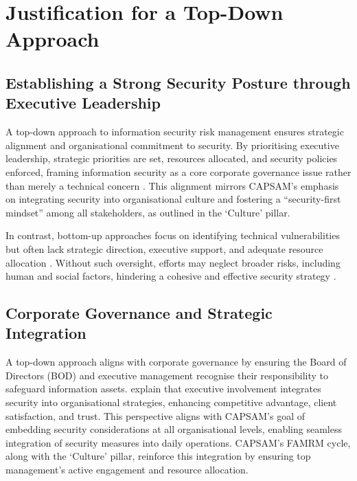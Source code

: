 \section{Justification for a Top-Down Approach}
    \subsection{Establishing a Strong Security Posture through Executive Leadership}
    A top-down approach to information security risk management ensures strategic alignment and organisational commitment to security. By prioritising executive leadership, strategic priorities are set, resources allocated, and security policies enforced, framing information security as a core corporate governance issue rather than merely a technical concern \citep{linkov2014risk, fazlida2015information}. This alignment mirrors CAPSAM's emphasis on integrating security into organisational culture and fostering a ``security-first mindset'' among all stakeholders, as outlined in the `Culture' pillar.
    
    In contrast, bottom-up approaches focus on identifying technical vulnerabilities but often lack strategic direction, executive support, and adequate resource allocation \citep{fazlida2015information}. Without such oversight, efforts may neglect broader risks, including human and social factors, hindering a cohesive and effective security strategy \citep{shedden2010information}.
    
    \subsection{Corporate Governance and Strategic Integration}
    A top-down approach aligns with corporate governance by ensuring the Board of Directors (BOD) and executive management recognise their responsibility to safeguard information assets. \citet{fazlida2015information} explain that executive involvement integrates security into organisational strategies, enhancing competitive advantage, client satisfaction, and trust. This perspective aligns with CAPSAM's goal of embedding security considerations at all organisational levels, enabling seamless integration of security measures into daily operations. CAPSAM's FAMRM cycle, along with the `Culture' pillar, reinforce this integration by ensuring top management's active engagement and resource allocation.
    
